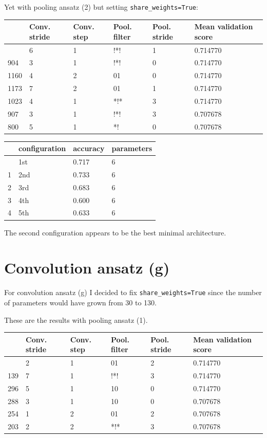 \documentclass[
  13pt,
  a4paper,
  DIV=11,
  numbers=noendperiod]{scrreprt}
\begin{document}
Yet with pooling ansatz (2) but setting \texttt{share\_weights=True}:

\begin{longtable}[]{@{}llllll@{}}
\toprule\noalign{}
& Conv. stride & Conv. step & Pool. filter & Pool. stride & Mean
validation score \\
\midrule\noalign{}
\endhead
\bottomrule\noalign{}
\endlastfoot
917 & 6 & 1 & !*! & 1 & 0.714770 \\
904 & 3 & 1 & !*! & 0 & 0.714770 \\
1160 & 4 & 2 & 01 & 0 & 0.714770 \\
1173 & 7 & 2 & 01 & 1 & 0.714770 \\
1023 & 4 & 1 & *!* & 3 & 0.714770 \\
907 & 3 & 1 & !*! & 3 & 0.707678 \\
800 & 5 & 1 & *! & 0 & 0.707678 \\
\end{longtable}

\begin{longtable}[]{@{}llll@{}}
\toprule\noalign{}
& configuration & accuracy & parameters \\
\midrule\noalign{}
\endhead
\bottomrule\noalign{}
\endlastfoot
0 & 1st & 0.717 & 6 \\
1 & 2nd & 0.733 & 6 \\
2 & 3rd & 0.683 & 6 \\
3 & 4th & 0.600 & 6 \\
4 & 5th & 0.633 & 6 \\
\end{longtable}

The second configuration appears to be the best minimal architecture.

\section{Convolution ansatz (g)}\label{convolution-ansatz-g}

For convolution ansatz (g) I decided to fix \texttt{share\_weights=True}
since the number of parameters would have grown from 30 to 130.

These are the results with pooling ansatz (1).

\begin{longtable}[]{@{}llllll@{}}
\toprule\noalign{}
& Conv. stride & Conv. step & Pool. filter & Pool. stride & Mean
validation score \\
\midrule\noalign{}
\endhead
\bottomrule\noalign{}
\endlastfoot
230 & 2 & 1 & 01 & 2 & 0.714770 \\
139 & 7 & 1 & !*! & 3 & 0.714770 \\
296 & 5 & 1 & 10 & 0 & 0.714770 \\
288 & 3 & 1 & 10 & 0 & 0.707678 \\
254 & 1 & 2 & 01 & 2 & 0.707678 \\
203 & 2 & 2 & *!* & 3 & 0.707678 \\
\end{longtable}
\end{document}
